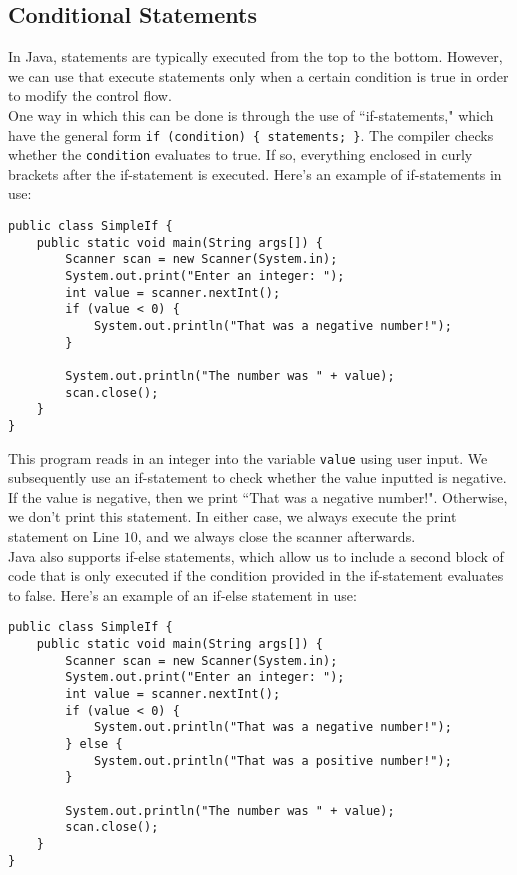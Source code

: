 \subsection{Conditional Statements}

In Java, statements are typically executed from the top to the bottom. However, we can use  that execute statements only when a certain condition is true in order to modify the control flow. \\

One way in which this can be done is through the use of ``if-statements,"  which have the general form \verb!if (condition) { statements; }!. The compiler checks whether the \verb!condition! evaluates to true. If so, everything enclosed in curly brackets after the if-statement is executed. Here's an example of if-statements in use:


\begin{lstlisting}
public class SimpleIf {
    public static void main(String args[]) {
        Scanner scan = new Scanner(System.in);
        System.out.print("Enter an integer: ");
        int value = scanner.nextInt();
        if (value < 0) {
            System.out.println("That was a negative number!");
        }
        
        System.out.println("The number was " + value);
        scan.close();
    }
}
\end{lstlisting}

This program reads in an integer into the variable \verb!value! using user input. We subsequently use an if-statement to check whether the value inputted is negative. If the value is negative, then we print ``That was a negative number!". Otherwise, we don't print this statement. In either case, we always execute the print statement on Line $10$, and we always close the scanner afterwards.\\


Java also supports if-else statements, which allow us to include a second block of code that is only executed if the condition provided in the if-statement evaluates to false. Here's an example of an if-else statement in use:


\begin{lstlisting}
public class SimpleIf {
    public static void main(String args[]) {
        Scanner scan = new Scanner(System.in);
        System.out.print("Enter an integer: ");
        int value = scanner.nextInt();
        if (value < 0) {
            System.out.println("That was a negative number!");
        } else {
            System.out.println("That was a positive number!");
        }
        
        System.out.println("The number was " + value);
        scan.close();
    }
}
\end{lstlisting}


